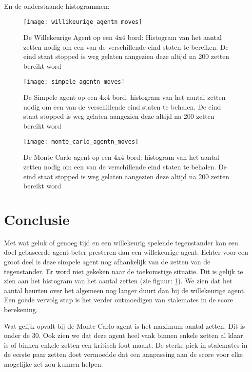 \documentclass[10pt]{article}
\begin{document}
En de onderstaande histogrammen:
\begin{figure}[!htbp]
\begin{center}
\texttt{[image: willikeurige\_agentn\_moves]}
\end{center}
\caption{De Willekeurige Agent op een 4x4 bord: Histogram van het aantal zetten nodig om een van de verschillende eind staten te bereiken. De eind staat stopped is weg gelaten aangezien deze altijd na 200 zetten bereikt word}
\end{figure}

\begin{figure}[!htbp]
\begin{center}
\texttt{[image: simpele\_agentn\_moves]}
\end{center}
\caption{De Simpele agent op een 4x4 bord: histogram van het aantal zetten nodig om een van de verschillende eind staten te behalen. De eind staat stopped is weg gelaten aangezien deze altijd na 200 zetten bereikt word}
\label{hist_simple}
\end{figure}

\begin{figure}[!htbp]
\begin{center}
\texttt{[image: monte\_carlo\_agentn\_moves]}
\end{center}
\caption{De Monte Carlo agent op een 4x4 bord: histogram van het aantal zetten nodig om een van de verschillende eind staten te behalen. De eind staat stopped is weg gelaten aangezien deze altijd na 200 zetten bereikt word}
\end{figure}

\pagebreak

\section{Conclusie}

Met wat geluk of genoeg tijd en een willekeurig spelende tegenstander kan een doel gebaseerde agent beter presteren dan een willekeurige agent. Echter voor een groot deel is deze simpele agent nog afhankelijk van de zetten van de tegenstander. Er word niet gekeken naar de toekomstige situatie. Dit is gelijk te zien aan het histogram van het aantal zetten (zie figuur: \ref{hist_simple}). We zien dat het aantal beurten over het algemeen nog langer duurt dan bij de willekeurige agent. Een goede vervolg stap is het verder ontmoedigen van stalemates in de score berekening.

Wat gelijk opvalt bij de Monte Carlo agent is het maximum aantal zetten. Dit is onder de 30. Ook zien we dat deze agent heel vaak binnen enkele zetten al klaar is of binnen enkele zetten een kritisch fout maakt. De sterke piek in stalemates in de eerste paar zetten doet vermoedde dat een aanpassing aan de score voor elke mogelijke zet zou kunnen helpen.
\end{document}
